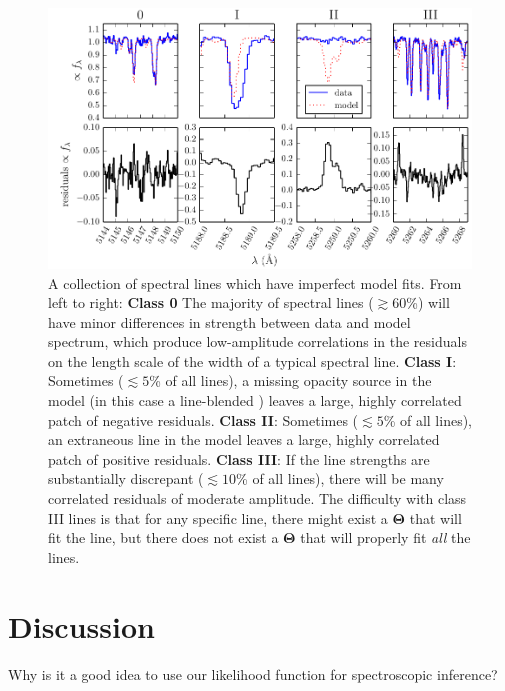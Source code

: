 \documentclass[iop,floatfix]{emulateapj}
\newcommand{\vT}{ {\bm \Theta}}
\begin{document}
\begin{figure}[!htb]
\begin{center}
  \includegraphics{figs/badlines.pdf}
  \caption{A collection of spectral lines which have imperfect model fits.
    From left to right: \textbf{Class 0} The majority of spectral lines
    ($\gtrsim 60$\%) will have minor differences in strength between data and
    model spectrum, which produce low-amplitude correlations in the residuals
    on the length scale of the width of a typical spectral line.  \textbf{Class
    I}: Sometimes ($\lesssim 5$\% of all lines), a missing opacity source in
    the model (in this case a line-blended ) leaves a large, highly correlated
    patch of negative residuals.  \textbf{Class II}: Sometimes ($\lesssim 5$\%
    of all lines), an extraneous line in the model leaves a large, highly
    correlated patch of positive residuals.  \textbf{Class III}: If the line strengths are
    substantially discrepant ($\lesssim 10$\% of all lines), there will be many
    correlated residuals of moderate amplitude.  The difficulty
    with class III lines is that for any specific line, there might exist a
    $\vT$ that will fit the line, but there does not exist a $\vT$ that
    will properly fit \emph{all} the lines.}
\label{fig:badlines}
\end{center}
\end{figure}

\section{Discussion}
\label{sec:discussion}

Why is it a good idea to use our likelihood function for spectroscopic inference?
\end{document}
